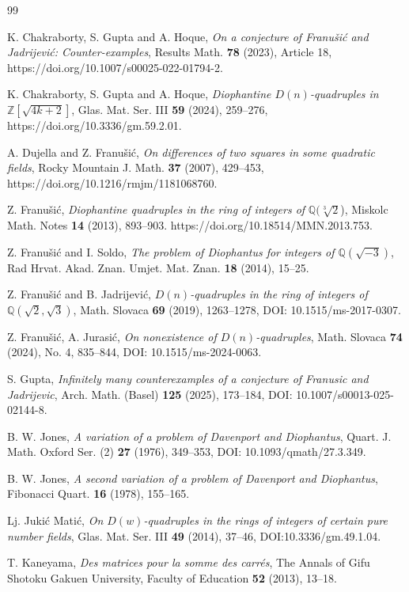 \documentclass[11pt]{amsart}
\def\Z{\mathbb{Z}}
\begin{document}
\begin{thebibliography}{99}


 K. Chakraborty, S. Gupta and A. Hoque, 
\textit{On a conjecture of Franu\v si\' c and Jadrijevi\' c: Counter-examples}, 
Results Math. \textbf{78} (2023), Article 18, https://doi.org/10.1007/s00025-022-01794-2.

 K. Chakraborty, S. Gupta and A. Hoque, \textit{Diophantine $D(n)$-quadruples in $\Z[\sqrt{4k+2}]$}, Glas. Mat. Ser. III \textbf{59} (2024), 259--276, https://doi.org/10.3336/gm.59.2.01.


 A. Dujella and Z. Franušić, \textit{On differences of two squares in some quadratic fields}, Rocky Mountain J. Math. \textbf{37} (2007), 429--453, https://doi.org/10.1216/rmjm/1181068760.


 Z. Franu\v si\' c, \textit{Diophantine quadruples in the ring of integers of} $\mathbb Q( \sqrt[3]2$), Miskolc Math. Notes \textbf{14} (2013), 893--903. https://doi.org/10.18514/MMN.2013.753.

 Z. Franu\v si\' c and I. Soldo, \textit{The problem of Diophantus for integers of  $\mathbb Q(\sqrt{-3})$}, Rad Hrvat. Akad. Znan. Umjet. Mat. Znan. \textbf{18} (2014), 15--25.

 Z. Franu\v si\' c and B. Jadrijevi\' c, \textit{$D(n)$-quadruples in the ring of integers of} $\mathbb Q(\sqrt 2,\sqrt 3)$, Math. Slovaca \textbf{69} (2019), 1263--1278, DOI: 10.1515/ms-2017-0307.


 Z. Franu\v si\' c, A. Jurasi\' c, \emph{On nonexistence of $D(n)$-quadruples}, Math. Slovaca \textbf{74} (2024), No. 4, 835--844, DOI: 10.1515/ms-2024-0063.

 S. Gupta, \textit{Infinitely many counterexamples of a conjecture of Franusic and Jadrijevic}, Arch. Math. (Basel) \textbf{125} (2025), 173--184, DOI: 10.1007/s00013-025-02144-8.

 B. W. Jones,  {\it A variation of a problem of Davenport and Diophantus}, Quart. J. Math. Oxford Ser. (2) \textbf{27} (1976), 349--353, DOI: 10.1093/qmath/27.3.349.

 B. W. Jones, {\it A second variation of a problem of Davenport and Diophantus}, Fibonacci Quart. \textbf{16} (1978), 155--165.

  Lj. Juki\' c Mati\' c, \textit{On $D(w)$-quadruples in the rings of integers of certain pure number fields}, Glas. Mat. Ser. III \textbf{49} (2014), 37--46, DOI:10.3336/gm.49.1.04.

 T. Kaneyama, \emph{Des matrices pour la somme des carr\' es},
The Annals of Gifu Shotoku Gakuen University, Faculty of Education \textbf{52} (2013), 13--18.




  \end{thebibliography}
\end{document}
